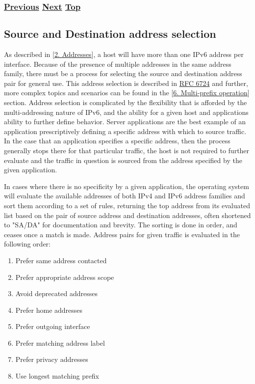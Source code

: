 \documentclass[
]{article}
\providecommand{\tightlist}{%
  \setlength{\itemsep}{0pt}\setlength{\parskip}{0pt}}
\begin{document}
\subsubsection{\texorpdfstring{\hyperref[extension-headers-and-options]{Previous}
\hyperref[source-and-destination-address-selection]{Next}
\hyperref[ipv6-basic-technology]{Top}}{Previous Next Top}}\label{previous-next-top-18}

\pagebreak

\subsection{Source and Destination address
selection}\label{source-and-destination-address-selection}

As described in {[}\hyperref[addresses]{2. Addresses}{]}, a host will
have more than one IPv6 address per interface. Because of the presence
of multiple addresses in the same address family, there must be a
process for selecting the source and destination address pair for
general use. This address selection is described in
\href{https://www.rfc-editor.org/info/rfc6724}{RFC 6724} and further,
more complex topics and scenarios can be found in the
{[}\hyperref[multi-prefix-operation]{6. Multi-prefix operation}{]}
section. Address selection is complicated by the flexibility that is
afforded by the multi-addressing nature of IPv6, and the ability for a
given host and applications ability to further define behavior. Server
applications are the best example of an application prescriptively
defining a specific address with which to source traffic. In the case
that an application specifies a specific address, then the process
generally stops there for that particular traffic, the host is not
required to further evaluate and the traffic in question is sourced from
the address specified by the given application.

In cases where there is no specificity by a given application, the
operating system will evaluate the available addresses of both IPv4 and
IPv6 address families and sort them according to a set of rules,
returning the top address from its evaluated list based on the pair of
source address and destination addresses, often shortened to "SA/DA" for
documentation and brevity. The sorting is done in order, and ceases once
a match is made. Address pairs for given traffic is evaluated in the
following order:

\begin{enumerate}
\def\labelenumi{\arabic{enumi}.}
\tightlist
\item
  Prefer same address contacted
\item
  Prefer appropriate address scope
\item
  Avoid deprecated addresses
\item
  Prefer home addresses
\item
  Prefer outgoing interface
\item
  Prefer matching address label
\item
  Prefer privacy addresses
\item
  Use longest matching prefix
\end{enumerate}
\end{document}
